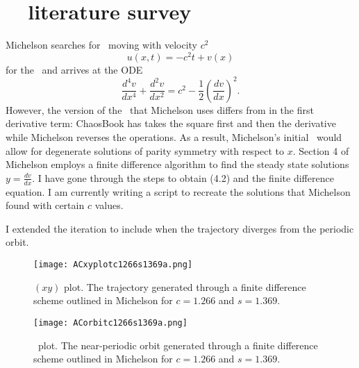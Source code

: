 \section{\KS\ \eqva\ literature survey}
\label{sect:KSeqvaLit}
\begin{description}

{Michelson searches for
\reqva\ moving with velocity $c^2$
\begin{equation}
    u(x,t) = -c^2 t + v(x)
\end{equation}
for the \KSe\ and arrives at the ODE
\begin{equation}
    \frac{d^4 v}{dx^4} + \frac{d^2 v}{dx^2} = c^2 - \frac{1}{2} \left( \frac{dv}{dx} \right)^2.
\label{ACwrongEqBlog}
\end{equation}
However, the version of the \KSe\ that Michelson uses differs from  in the first derivative term: ChaosBook has takes the square first and then the derivative while Michelson reverses the operations. As a result, Michelson's initial \KSe\ would allow for degenerate solutions of parity symmetry with respect to $x$.
Section 4 of Michelson employs a finite difference algorithm to find the
steady state solutions $y = \frac{dv}{dx}$. I have gone through the steps to
obtain (4.2) and the finite difference equation. I am currently writing a
script to recreate the solutions that Michelson found with certain $c$ values.

I extended the iteration to include when the trajectory diverges from the
periodic orbit.

\begin{figure}[h!]
  \centering
  \texttt{[image: ACxyplotc1266s1369a.png]}
  \caption{
$(xy)$ plot. The trajectory generated through a finite difference scheme
outlined in Michelson for $c=1.266$ and $s=1.369$.
  }

  \texttt{[image: ACorbitc1266s1369a.png]}
  \caption{\Statesp\ plot. The near-periodic orbit generated through a finite difference
  scheme outlined in Michelson for $c=1.266$ and $s=1.369$.}
\end{figure}
}


\end{description}
